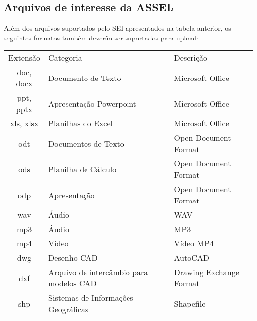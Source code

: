  \pagebreak

\subsection{Arquivos de interesse da ASSEL}


Além dos arquivos suportados pelo SEI apresentados na tabela anterior, os seguintes formatos também deverão ser suportados para upload:

\begin{center}
	\begin{tabular}{|c|p{5cm}|l|}
		\hline
		\rowcolor{corCOULD!40} \multicolumn{3}{|c|}{\Large Arquivos de interesse da ASSEL \normalsize} \\ \hline
		
		\rowcolor{lightgray} Extensão & Categoria & Descrição \\ \hline
		
		
		\rowcolor{cldfA!30} doc, docx & Documento de Texto & Microsoft Office  \\ \hline
		\rowcolor{cldfA!30} ppt, pptx & Apresentação Powerpoint & Microsoft Office  \\ \hline
		\rowcolor{cldfA!30} xls, xlsx & Planilhas do Excel & Microsoft Office  \\ \hline

		\rowcolor{cldfB!30} odt & Documentos de Texto & Open Document Format  \\ \hline
		\rowcolor{cldfB!30} ods & Planilha de Cálculo & Open Document Format  \\ \hline
		\rowcolor{cldfB!30} odp & Apresentação & Open Document Format  \\ \hline
		
		\rowcolor{cldfG!30} wav & Áudio & WAV  \\ \hline
		\rowcolor{cldfG!30} mp3 & Áudio & MP3  \\ \hline
		
		\rowcolor{cldfC!30} mp4 & Vídeo & Vídeo MP4  \\ \hline


		\rowcolor{cldfI!30} dwg & Desenho CAD & AutoCAD  \\ \hline
		\rowcolor{cldfI!30} dxf & Arquivo de intercâmbio para modelos CAD & Drawing Exchange Format  \\ \hline
		\rowcolor{cldfI!30} shp & Sistemas de Informações Geográficas & Shapefile  \\ \hline


	\end{tabular}    
\end{center}
